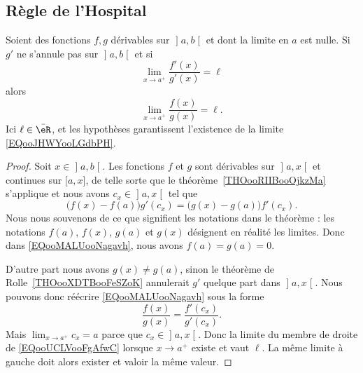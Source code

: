 \subsection{Règle de l'Hospital}

\begin{proposition}     \label{PROPooBZHTooHmyGsy}
	Soient des fonctions \( f,g\) dérivables sur \( \mathopen] a , b \mathclose[\) et dont la limite en \( a\) est nulle. Si \( g'\) ne s'annule pas sur \( \mathopen] a , b \mathclose[\) et si
	\begin{equation}
		\lim_{x\to a^+} \frac{ f'(x) }{ g'(x) }=\ell
	\end{equation}
	alors
	\begin{equation}        \label{EQooJHWYooLGdbPH}
		\lim_{x\to a^+} \frac{ f(x) }{ g(x) }=\ell.
	\end{equation}
	Ici \( \ell\in \bar \eR\), et les hypothèses garantissent l'existence de la limite \eqref{EQooJHWYooLGdbPH}.
\end{proposition}

\begin{proof}
	Soit \( x\in\mathopen] a , b \mathclose[\). Les fonctions \( f\) et \( g\) sont dérivables sur \( \mathopen] a , x \mathclose[\) et continues sur \( \mathopen[ a , x \mathclose]\), de telle sorte que le théorème~\ref{THOooRIIBooOjkzMa} s'applique et nous avons \( c_x\in \mathopen] a , x \mathclose[\) tel que
		\begin{equation}        \label{EQooMALUooNagavh}
			\big( f(x)-f(a) \big)g'(c_x)=\big( g(x)-g(a) \big)f'(c_x).
		\end{equation}
		Nous nous souvenons de ce que signifient les notations dans le théorème : les notations \( f(a)\), \( f(x)\), \( g(a)\) et \( g(x)\) désignent en réalité les limites. Donc dans \eqref{EQooMALUooNagavh}, nous avons \( f(a)=g(a)=0\).

		D'autre part nous avons \( g(x)\neq g(a)\), sinon le théorème de Rolle~\ref{THOooXDTBooFeSZoK} annulerait \( g'\) quelque part dans \( \mathopen] a , x \mathclose[\). Nous pouvons donc réécrire \eqref{EQooMALUooNagavh} sous la forme
		\begin{equation}        \label{EQooUCLVooFgAfwC}
			\frac{ f(x) }{ g(x) }=\frac{ f'(c_x) }{ g'(c_x) }.
		\end{equation}
		Mais \( \lim_{x\to a^+} c_x=a\) parce que \( c_x\in\mathopen] a , x \mathclose[\). Donc la limite du membre de droite de \eqref{EQooUCLVooFgAfwC} lorsque \( x\to a^+\) existe et vaut \( \ell\). La même limite à gauche doit alors exister et valoir la même valeur.
\end{proof}


